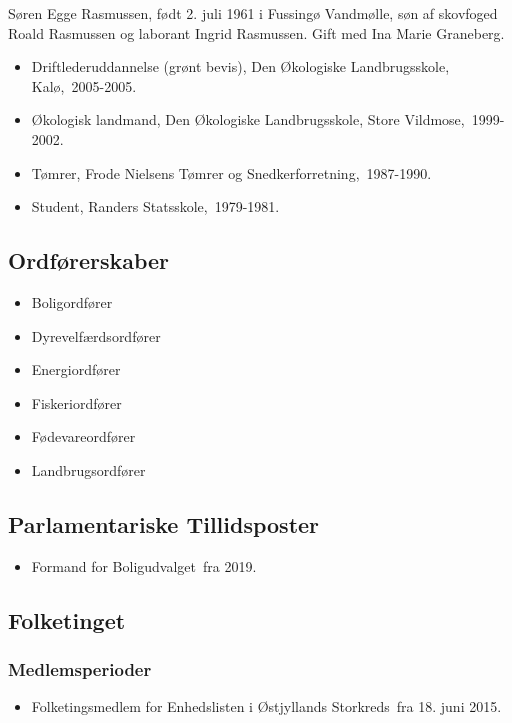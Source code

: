 \documentclass[11pt, a4paper]{awesome-cv}
\begin{document}
\makecvheader[R]
\makelettertitle
\begin{cvletter}
Søren Egge Rasmussen, født 2. juli 1961 i Fussingø Vandmølle, søn af skovfoged Roald Rasmussen og laborant Ingrid Rasmussen. Gift med Ina Marie Graneberg.

\begin{itemize}
\item Driftlederuddannelse (grønt bevis), Den Økologiske Landbrugsskole, Kalø, 2005-2005.
\item Økologisk landmand, Den Økologiske Landbrugsskole, Store Vildmose, 1999-2002.
\item Tømrer, Frode Nielsens Tømrer og Snedkerforretning, 1987-1990.
\item Student, Randers Statsskole, 1979-1981.
\end{itemize}
\subsection*{Ordførerskaber}
\begin{itemize}
\item Boligordfører
\item Dyrevelfærdsordfører
\item Energiordfører
\item Fiskeriordfører
\item Fødevareordfører
\item Landbrugsordfører
\end{itemize}
\subsection*{Parlamentariske Tillidsposter}
\begin{itemize}
\item Formand for Boligudvalget fra 2019.
\end{itemize}
\subsection*{Folketinget}
\subsubsection*{Medlemsperioder}
\begin{itemize}
\item Folketingsmedlem for Enhedslisten i Østjyllands Storkreds fra 18. juni 2015.
\end{itemize}

\end{cvletter}
\end{document}
